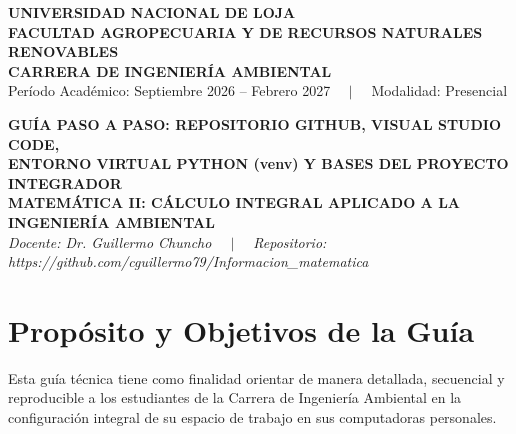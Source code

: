 \documentclass[11pt,a4paper]{article}
\begin{document}
\thispagestyle{plain}

\begin{center}
  {\Large\textbf{\color{azulOscuro}UNIVERSIDAD NACIONAL DE LOJA}}\vspace{0.10cm}\\
  {\large\textbf{\color{unlbluelight}FACULTAD AGROPECUARIA Y DE RECURSOS NATURALES RENOVABLES}}\vspace{0.06cm}\\
  {\normalsize\textbf{CARRERA DE INGENIERÍA AMBIENTAL}}\vspace{0.10cm}\\
  {\small Período Académico: Septiembre 2026 -- Febrero 2027 $\quad\vert\quad$ Modalidad: Presencial}
\end{center}

\vspace{0.10cm}

\begin{bannerbox}
  \centering\color{white}
  {\Large\bfseries GUÍA PASO A PASO: REPOSITORIO GITHUB, VISUAL STUDIO CODE,}\\[0.10cm]
  {\Large\bfseries ENTORNO VIRTUAL PYTHON (venv) Y BASES DEL PROYECTO INTEGRADOR}\\[0.10cm]
  {\normalsize\textbf{MATEMÁTICA II: CÁLCULO INTEGRAL APLICADO A LA INGENIERÍA AMBIENTAL}}\\[0.06cm]
  {\footnotesize\textit{Docente: Dr. Guillermo Chuncho $\quad\vert\quad$ Repositorio: https://github.com/cguillermo79/Informacion\_matematica}}
\end{bannerbox}

\vspace{0.25cm}

\section{Propósito y Objetivos de la Guía}

Esta guía técnica tiene como finalidad orientar de manera detallada, secuencial y reproducible a los estudiantes de la Carrera de Ingeniería Ambiental en la configuración integral de su espacio de trabajo en sus computadoras personales. 
\end{document}
